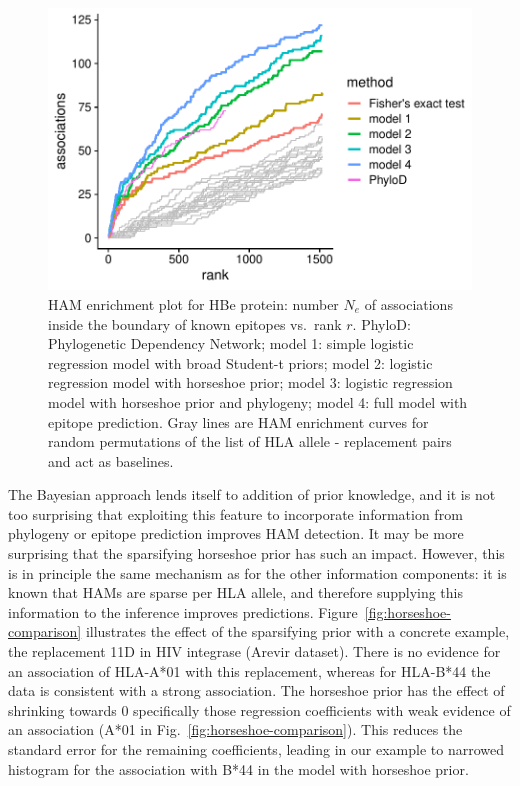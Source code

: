 \documentclass{bioinfo}
\begin{document}
\begin{figure}[ht!]
  \includegraphics[width=1\linewidth]{plots/comparison.pdf}
  \caption{HAM enrichment plot for HBe protein: number $N_e$ of associations inside the boundary of known epitopes vs.\ rank $r$. PhyloD: Phylogenetic Dependency Network; model 1: simple logistic regression model with broad Student-t priors; model 2: logistic regression model with horseshoe prior; model 3: logistic regression model with horseshoe prior and phylogeny; model 4: full model with epitope prediction. Gray lines are HAM enrichment curves for random permutations of the list of HLA allele - replacement pairs and act as baselines.}
  \label{fig:comparison}
\end{figure}

The Bayesian approach lends itself to addition of prior knowledge, and it is not too surprising that exploiting this feature to incorporate information from phylogeny or epitope prediction improves HAM detection. It may be more surprising that the sparsifying horseshoe prior has such an impact. However, this is in principle the same mechanism as for the other information components: it is known that HAMs are sparse per HLA allele, and therefore supplying this information to the inference improves predictions. Figure~\ref{fig:horseshoe-comparison} illustrates the effect of the sparsifying prior with a concrete example, the replacement 11D in HIV integrase (Arevir dataset). There is no evidence for an association of HLA-A*01 with this replacement, whereas for HLA-B*44 the data is consistent with a strong association.  The horseshoe prior has the effect of shrinking towards 0 specifically those regression coefficients with weak evidence of an association (A*01 in Fig.~\ref{fig:horseshoe-comparison}). This reduces the standard error for the remaining coefficients, leading in our example to narrowed histogram for the association with B*44 in the model with horseshoe prior.
\end{document}

